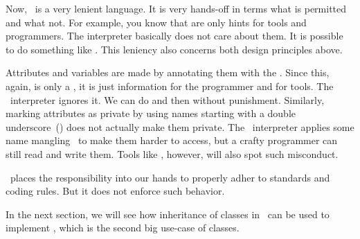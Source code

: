 Now, \python\ is a very lenient language.
It is very hands-off in terms what is permitted and what not.
For example, you know that  are only hints for tools and programmers.
The \python interpreter basically does not care about them.
It is possible to do something like .
This leniency also concerns both design principles above.

Attributes and variables are made  by annotating them with the  .
Since this, again, is only a , it is just information for the programmer and for tools.
The \python\ interpreter ignores it.
We can do  and then  without punishment.
Similarly, marking attributes as private by using names starting with a double underscore~(\pythonilIdx{\_\_}) does not actually make them private.
The \python\ interpreter applies some name mangling~\cite{PEP8} to make them harder to access, but a crafty programmer can still read and write them.
Tools like \mypy, however, will also spot such misconduct.

\python\ places the responsibility into our hands to properly adher to standards and coding rules.
But it does not enforce such behavior.

In the next section, we will see how inheritance of classes in \python\ can be used to implement , which is the second big use-case of classes.%
\endhsection%
%
\FloatBarrier%
\endhsection%
